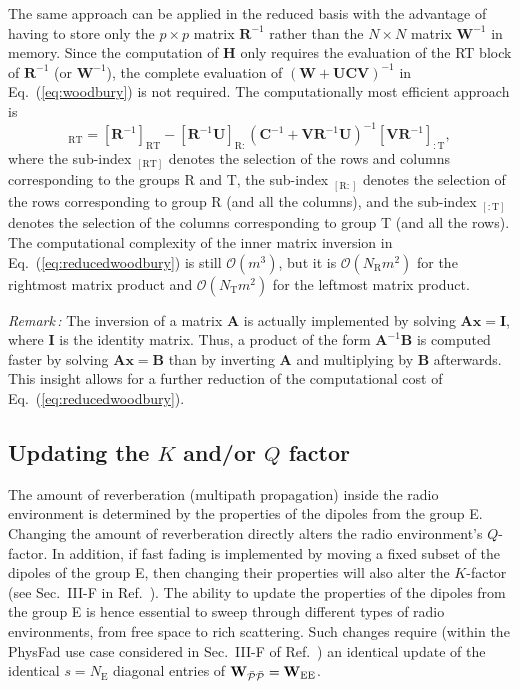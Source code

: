 \documentclass[journal,12pt,onecolumn,draftclsnofoot]{IEEEtran}
\begin{document}
The same approach can be applied in the reduced basis with the advantage of having to store only the $p\times p$ matrix $\mathbf{R}^{-1}$ rather than the $N \times N$ matrix $\mathbf{W}^{-1}$ in memory.
Since the computation of $\mathbf{H}$ only requires the evaluation of the RT block of $\mathbf{R}^{-1}$ (or $\mathbf{W}^{-1}$), the complete evaluation of $\mathbf{\left(W+UCV\right)}^{-1}$ in Eq.~(\ref{eq:woodbury}) is not required. The computationally most efficient approach is
\begin{equation}
[\left(\mathbf{R}+\mathbf{UCV}\right)^{-1}]_{\mathrm{RT}} = [\mathbf{R}^{-1}]_{\mathrm{RT}} 
- \left[\mathbf{R}^{-1}\mathbf{U}\right]_{\mathrm{R:}}\left(\mathbf{C}^{-1}+\mathbf{VR}^{-1}\mathbf{U}\right)^{-1}\left[\mathbf{V}\mathbf{R}^{-1}\right]_{\mathrm{:T}},
\label{eq:reducedwoodbury}
\end{equation}
where the sub-index $_\mathrm{[RT]}$ denotes the selection of the rows and columns corresponding to the groups R and T,  the sub-index $_\mathrm{[R:]}$ denotes the selection of the rows corresponding to group R (and all the columns), and the sub-index $_\mathrm{[:T]}$ denotes the selection of the columns corresponding to group T (and all the rows).
The computational complexity of the inner matrix inversion in Eq.~(\ref{eq:reducedwoodbury}) is still $\mathcal{O}\left(m^3\right)$, but it is $\mathcal{O}\left(N_\mathrm{R}m^2\right)$ for the rightmost matrix product and $\mathcal{O}\left(N_\mathrm{T}m^2\right)$ for the leftmost matrix product.

\textit{Remark\,:} The inversion of a matrix $\mathbf{A}$ is actually implemented by solving $\mathbf{Ax}=\mathbf{I}$, where $\mathbf{I}$ is the identity matrix. Thus, a product of the form $\mathbf{A}^{-1}\mathbf{B}$ is computed faster by solving $\mathbf{Ax}=\mathbf{B}$ than by inverting $\mathbf{A}$ and multiplying by $\mathbf{B}$ afterwards. This insight allows for a further reduction of the computational cost of Eq.~(\ref{eq:reducedwoodbury}).





\subsection{Updating the $K$ and/or $Q$ factor}
\label{sec_KQfactor}

The amount of reverberation (multipath propagation) inside the radio environment is determined by the properties of the dipoles from the group E. Changing the amount of reverberation directly alters the radio environment's $Q$-factor. In addition, if fast fading is implemented by moving a fixed subset of the dipoles of the group E, then changing their properties will also alter the $K$-factor (see Sec.~III-F in Ref.~\cite{PhysFad}). The ability to update the properties of the dipoles from the group E is hence essential to sweep through different types of radio environments, from free space to rich scattering. Such changes require (within the PhysFad use case considered in Sec.~III-F of Ref.~\cite{PhysFad}) an identical update of the identical $s = N_{\mathrm{E}}$ diagonal entries of $\mathbf{W}_{\mathcal{\Bar{P}\Bar{P}}} = \mathbf{W}_{\mathrm{EE}}$.
\end{document}

